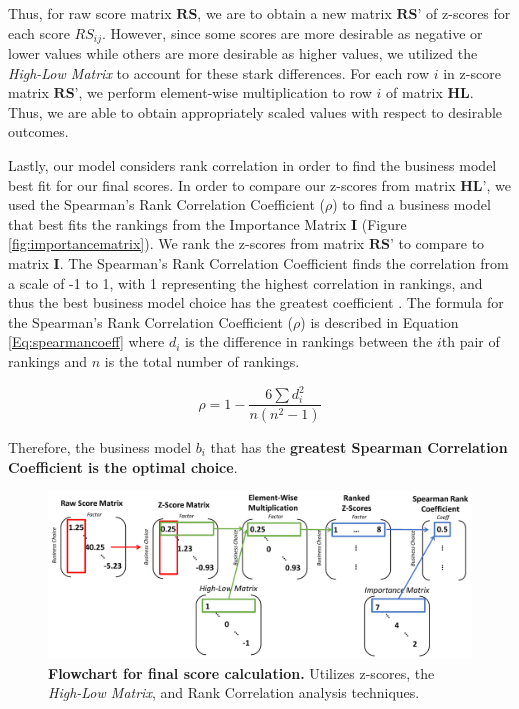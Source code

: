 \documentclass{mcmthesis}
\begin{document}
Thus, for raw score matrix $\textbf{RS}$, we are to obtain a new matrix $\textbf{RS'}$ of z-scores for each score $RS_{ij}$. However, since some scores are more desirable as negative or lower values while others are more desirable as higher values, we utilized the \textit{High-Low Matrix} to account for these stark differences. For each row $i$ in z-score matrix $\textbf{RS'}$, we perform element-wise multiplication to row $i$ of matrix $\textbf{HL}$. Thus, we are able to obtain appropriately scaled values with respect to desirable outcomes. 

Lastly, our model considers rank correlation in order to find the business model best fit for our final scores. In order to compare our z-scores from matrix $\textbf{HL'}$, we used the Spearman's Rank Correlation Coefficient ($\rho$) to find a business model that best fits the rankings from the Importance Matrix \textbf{I} (Figure \ref{fig:importancematrix}). We rank the z-scores from matrix $\textbf{RS'}$ to compare to matrix $\textbf{I}$. The Spearman's Rank Correlation Coefficient finds the correlation from a scale of -1 to 1, with 1 representing the highest correlation in rankings, and thus the best business model choice has the greatest coefficient \cite{noauthor_182_nodate}. The formula for the Spearman's Rank Correlation Coefficient ($\rho$) is described in Equation \ref{Eq:spearmancoeff} where $d_i$ is the difference in rankings between the $i$th pair of rankings and $n$ is the total number of rankings.

\begin{equation}
    \rho = 1 - \frac{6\sum d_i^2}{n(n^2-1)}
    \label{Eq:spearmancoeff}
\end{equation}

Therefore, the business model $b_i$ that has the \textbf{greatest Spearman Correlation Coefficient is the optimal choice}.

\begin{figure}[!htbp]
    \centering
    \includegraphics[scale=0.55]{figures/matrixvisual.pdf}
    \caption{\textbf{Flowchart for final score calculation.} Utilizes z-scores, the \textit{High-Low Matrix}, and Rank Correlation analysis techniques.}
    \label{fig:finalscorecalc}
\end{figure}
\end{document}
